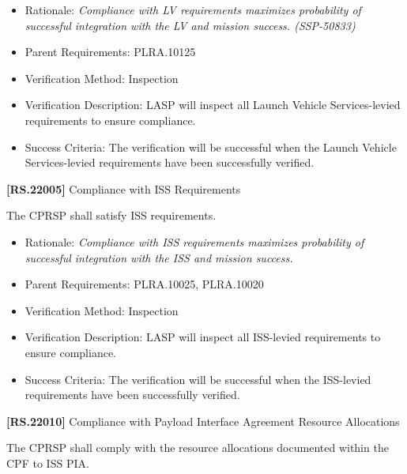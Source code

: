 \documentclass[12pt,oneside,oldfontcommands]{memoir}
\begin{document}
\begin{itemize}
\item{} Rationale: \emph{Compliance with LV requirements maximizes probability of successful integration with the LV and mission success. (SSP-50833)}

\item{} Parent Requirements: PLRA.10125

\item{} Verification Method: Inspection

\item{} Verification Description: \gls{LASP} will inspect all Launch Vehicle Services-levied requirements to ensure compliance.

\item{} Success Criteria: The verification will be successful when the Launch Vehicle Services-levied requirements have been successfully verified.

\end{itemize}

\textbf{[RS.22005]} Compliance with \gls{ISS} Requirements

The \gls{CPRSP} shall satisfy \gls{ISS} requirements.

\begin{itemize}
\item{} Rationale: \emph{Compliance with ISS requirements maximizes probability of successful integration with the ISS and mission success.}

\item{} Parent Requirements: PLRA.10025, PLRA.10020

\item{} Verification Method: Inspection

\item{} Verification Description: \gls{LASP} will inspect all \gls{ISS}-levied requirements to ensure compliance.

\item{} Success Criteria: The verification will be successful when the \gls{ISS}-levied requirements have been successfully verified.

\end{itemize}

\textbf{[RS.22010]} Compliance with Payload Interface Agreement Resource Allocations

The \gls{CPRSP} shall comply with the resource allocations documented within the \gls{CPF} to \gls{ISS} \gls{PIA}.
\end{document}

